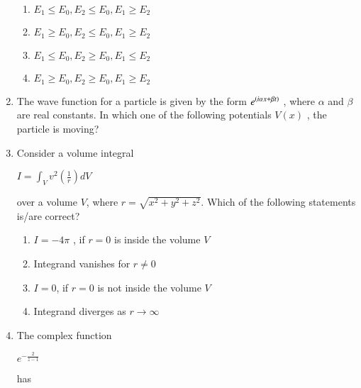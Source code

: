 \documentclass[journal]{IEEEtran}
\begin{document}
\begin{enumerate}
\begin{enumerate}
\item $E_1 \leq E_0 , E_2 \leq E_0 , E_1 \geq E_2$ 
\item $E_1 \geq E_0 , E_2 \leq E_0 , E_1 \geq E_2$ 
\item $E_1 \leq E_0 , E_2 \geq E_0 , E_1 \leq E_2 $
\item $E_1 \geq E_0 , E_2 \geq E_0 , E_1 \geq E_2 $
\end{enumerate} 
\newpage
\item The wave function for a particle is given by the form  $e^{\left(i \alpha x + \beta t\right)}$ , where  $\alpha$  and  $\beta$ are real constants. In which one of the following potentials $V(x)$ , the particle is moving?
\begin{enumerate}
\end{enumerate}
\item  Consider a volume integral
\begin{center}
$I = \int_V v^2 \left( \frac{1}{r} \right) dV$
\end{center}
over a volume $V$, where $r = \sqrt{x^2 + y^2 + z^2}$. Which of the following statements is/are correct?
\begin{enumerate}
\item $I = -4\pi$ , if $r = 0$ is inside the volume $V$ 
\item Integrand vanishes for $r \neq 0$ 
\item $I = 0$, if $r = 0$ is not inside the volume $V$ 
\item Integrand diverges as $r \to \infty$ 
\end{enumerate}
\item The complex function
\begin{center}
  $e^{-\frac{2}{z - 1}}$  
\end{center}
has
\begin{enumerate}
\end{enumerate}
\end{enumerate}
\end{document}
